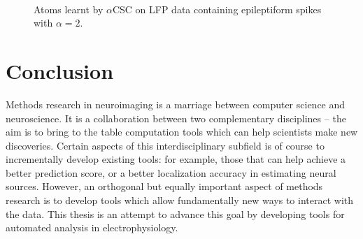 \begin{figure}[b]
    \centering
              \\

            \caption[Atoms learnt by $\alpha$CSC on LFP data containing epileptiform spikes with $\alpha=2$.]{Atoms learnt by $\alpha$CSC on LFP data containing epileptiform spikes with $\alpha=2$.}
\end{figure}


\section*{Conclusion}

Methods research in neuroimaging is a marriage between computer science and neuroscience. It is a collaboration between two complementary disciplines -- the aim is to bring to the table computation tools which can help scientists make new discoveries. Certain aspects of this interdisciplinary subfield is of course to incrementally develop existing tools: for example, those that can help achieve a better prediction score, or a better localization accuracy in estimating neural sources. However, an orthogonal but equally important aspect of methods research is to develop tools which allow fundamentally new ways to interact with the data. This thesis is an attempt to advance this goal by developing tools for automated analysis in electrophysiology.

